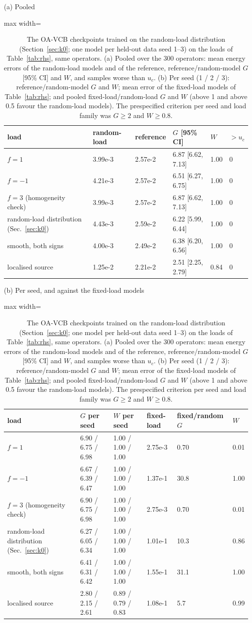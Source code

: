\begin{table}[tbp]\centering\footnotesize\setlength{\tabcolsep}{4pt}
\caption{The OA-VCB checkpoints trained on the random-load distribution (Section~\ref{sec:k0}; one model per held-out data seed 1--3) on the loads of Table~\ref{tab:rhs}, same operators. (a) Pooled over the 300 operators: mean energy errors of the random-load models and of the reference, reference/random-model $G$ [95\% CI] and $W$, and samples worse than $u_c$. (b) Per seed (1 / 2 / 3): reference/random-model $G$ and $W$; mean error of the fixed-load models of Table~\ref{tab:rhs}; and pooled fixed-load/random-load $G$ and $W$ (above 1 and above 0.5 favour the random-load models). The prespecified criterion per seed and load family was $G\ge2$ and $W\ge0.8$.}\label{tab:rhsrandom}
{\small (a) Pooled}\par\smallskip
\begin{adjustbox}{max width=\linewidth}
\begin{tabular}{llllll}\toprule
load & random-load & reference & $G$ [95\% CI] & $W$ & $>u_c$ \\\midrule
$f=1$ & 3.99e-3 & 2.57e-2 & 6.87 [6.62, 7.13] & 1.00 & 0 \\
$f=-1$ & 4.21e-3 & 2.57e-2 & 6.51 [6.27, 6.75] & 1.00 & 0 \\
$f=3$ (homogeneity check) & 3.99e-3 & 2.57e-2 & 6.87 [6.62, 7.13] & 1.00 & 0 \\
random-load distribution (Sec.~\ref{sec:k0}) & 4.43e-3 & 2.59e-2 & 6.22 [5.99, 6.44] & 1.00 & 0 \\
smooth, both signs & 4.00e-3 & 2.49e-2 & 6.38 [6.20, 6.56] & 1.00 & 0 \\
localised source & 1.25e-2 & 2.21e-2 & 2.51 [2.25, 2.79] & 0.84 & 0 \\
\bottomrule\end{tabular}
\end{adjustbox}
\par\medskip
{\small (b) Per seed, and against the fixed-load models}\par\smallskip
\begin{adjustbox}{max width=\linewidth}
\begin{tabular}{llllll}\toprule
load & $G$ per seed & $W$ per seed & fixed-load & fixed/random $G$ & $W$ \\\midrule
$f=1$ & 6.90 / 6.75 / 6.98 & 1.00 / 1.00 / 1.00 & 2.75e-3 & 0.70 & 0.01 \\
$f=-1$ & 6.67 / 6.39 / 6.47 & 1.00 / 1.00 / 1.00 & 1.37e-1 & 30.8 & 1.00 \\
$f=3$ (homogeneity check) & 6.90 / 6.75 / 6.98 & 1.00 / 1.00 / 1.00 & 2.75e-3 & 0.70 & 0.01 \\
random-load distribution (Sec.~\ref{sec:k0}) & 6.27 / 6.05 / 6.34 & 1.00 / 1.00 / 1.00 & 1.01e-1 & 10.3 & 0.86 \\
smooth, both signs & 6.41 / 6.31 / 6.42 & 1.00 / 1.00 / 1.00 & 1.55e-1 & 31.1 & 1.00 \\
localised source & 2.80 / 2.15 / 2.61 & 0.89 / 0.79 / 0.83 & 1.08e-1 & 5.7 & 0.99 \\
\bottomrule\end{tabular}
\end{adjustbox}
\end{table}
